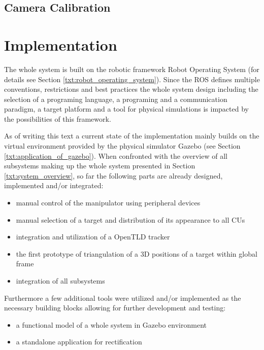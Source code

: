 \section{Camera Calibration}


\chapter{Implementation} \label{txt:implementation}

The whole system is built on the robotic framework Robot Operating System (for details see Section \ref{txt:robot_operating_system}). Since the ROS defines multiple conventions, restrictions and best practices the whole system design including the selection of a programing language, a programing and a communication paradigm, a target platform and a tool for physical simulations is impacted by the possibilities of this framework.

As of writing this text a current state of the implementation mainly builds on the virtual environment provided by the physical simulator Gazebo (see Section \ref{txt:application_of_gazebo}). When confronted with the overview of all subsystems making up the whole system presented in Section \ref{txt:system_overview}, so far the following parts are already designed, implemented and/or integrated:

\begin{itemize}
\item manual control of the manipulator using peripheral devices
\item manual selection of a target and distribution of its appearance to all CUs
\item integration and utilization of a OpenTLD tracker
\item the first prototype of triangulation of a 3D positions of a target within global frame
\item integration of all subsystems
\end{itemize}

Furthermore a few additional tools were utilized and/or implemented as the necessary building blocks allowing for further development and testing:

\begin{itemize}
\item a functional model of a whole system in Gazebo environment
\item a standalone application for rectification
\end{itemize}


